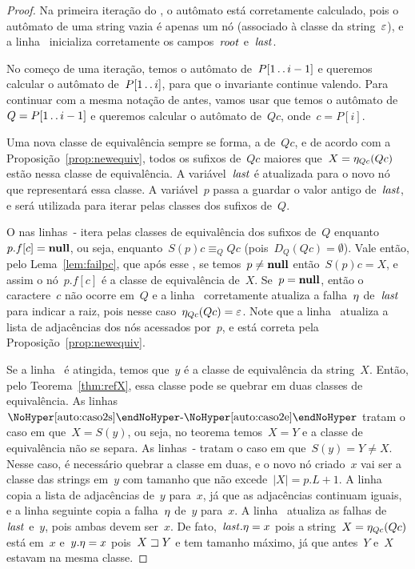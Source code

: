\begin{proof}
Na primeira iteração do , o autômato está corretamente calculado, pois o autômato de uma string vazia é apenas um nó (associado à classe da string~$\varepsilon$), e a linha~ inicializa corretamente os campos~$\mathit{root}$ e~$\mathit{last}$.

No começo de uma iteração, temos o autômato de~$P[1\,.\,.\, i-1]$ e queremos calcular o autômato de~$P[1\,.\,.\, i]$, para que o invariante continue valendo. Para continuar com a mesma notação de antes, vamos usar que temos o autômato de~${Q = P[1\,.\,.\, i-1]}$ e queremos calcular o autômato de~$Qc$, onde~${c = P[i]}$.

Uma nova classe de equivalência sempre se forma, a de~$Qc$, e de acordo com a Proposição~\ref{prop:newequiv}, todos os sufixos de~$Qc$ maiores que~$X = \eta_{Qc}(Qc)$ estão nessa classe de equivalência. A variável~$\mathit{last}$ é atualizada para o novo nó que representará essa classe. A variável~$p$ passa a guardar o valor antigo de~$\mathit{last}$, e será utilizada para iterar pelas classes dos sufixos de~$Q$.

O  nas linhas~- itera pelas classes de equivalência dos sufixos de~$Q$ enquanto~${p.f[c] = \textbf{null}}$, ou seja, enquanto~${S(p)c \equiv_Q Qc}$ (pois~${D_Q(Qc) = \emptyset}$). Vale então, pelo Lema~\ref{lem:failpc}, que após esse , se temos~$p \neq \textbf{null}$ então~${S(p)c = X}$, e assim o nó~$p.f[c]$ é a classe de equivalência de~$X$. Se~${p = \textbf{null}}$, então o caractere~$c$ não ocorre em~$Q$ e a linha~ corretamente atualiza a falha~$\eta$ de~$\mathit{last}$ para indicar a raiz, pois nesse caso~${\eta_{Qc}(Qc) = \varepsilon}$.
Note que a linha~ atualiza a lista de adjacências dos nós acessados por~$p$, e está correta pela Proposição~\ref{prop:newequiv}.

Se a linha~ é atingida, temos que~$y$ é a classe de equivalência da string~$X$. Então, pelo Teorema~\ref{thm:refX}, essa classe pode se quebrar em duas classes de equivalência. As linhas~${\nref{auto:caso2s}\text{-}\nref{auto:caso2e}}$ tratam o caso em que~$X = S(y)$, ou seja, no teorema temos~${X = Y}$ e a classe de equivalência não se separa.
As linhas~- tratam o caso em que~$S(y) = Y \neq X$. Nesse caso, é necessário quebrar a classe em duas, e o novo nó criado~$x$ vai ser a classe das strings em~$y$ com tamanho que não excede~$|X| = p.L + 1$.
A linha~ copia a lista de adjacências de~$y$ para~$x$, já que as adjacências continuam iguais, e a linha seguinte copia a falha~$\eta$ de~$y$ para~$x$.
A linha~ atualiza as falhas de~$\mathit{last}$ e~$y$, pois ambas devem ser~$x$. De fato,~$\mathit{last}.\eta = x$ pois a string~${X = \eta_{Qc}(Qc)}$ está em~$x$ e~$y.\eta = x$ pois~$X \sqsupset Y$ e tem tamanho máximo, já que antes~$Y$ e~$X$ estavam na mesma classe.


\end{proof}
